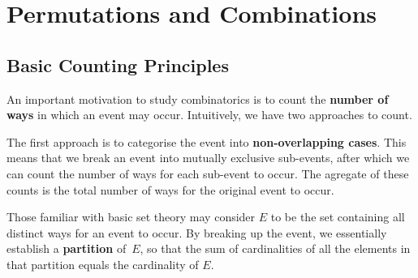 \documentclass[math]{amznotes}
\theoremstyle{remark}
\begin{document}
\tableofcontents

\chapter{Permutations and Combinations}
\section{Basic Counting Principles}
An important motivation to study combinatorics is to count the \textbf{number of ways} in which an event may occur. Intuitively, we have two approaches to count.

The first approach is to categorise the event into \textbf{non-overlapping cases}. This means that we break an event into mutually exclusive sub-events, after which we can count the number of ways for each sub-event to occur. The agregate of these counts is the total number of ways for the original event to occur.

Those familiar with basic set theory may consider $E$ to be the set containing all distinct ways for an event to occur. By breaking up the event, we essentially establish a \textbf{partition} of~$E$, so that the sum of cardinalities of all the elements in that partition equals the cardinality of $E$.
\end{document}
